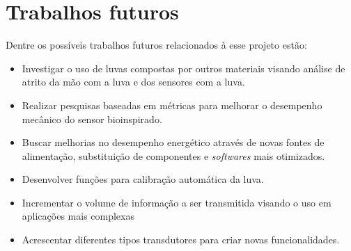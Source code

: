 \documentclass[
	12pt,				%
	openright,			%
	oneside,			%
	a4paper,			%
	english,			%
	brazil				%
	]{abntex2}
\begin{document}
			\section{Trabalhos futuros}		

		Dentre os possíveis trabalhos futuros relacionados à esse projeto estão:

		\begin{itemize}
			\item Investigar o uso de luvas compostas por outros materiais visando análise de atrito da mão com a luva e dos sensores com a luva.
			\item Realizar pesquisas baseadas em métricas para melhorar o desempenho mecânico do sensor bioinspirado.
			\item Buscar melhorias no desempenho energético através de novas fontes de alimentação, substituição de componentes e \textit{softwares} mais otimizados.
			\item Desenvolver funções para calibração automática da luva.
			\item Incrementar o volume de informação a ser transmitida visando o uso em aplicações mais complexas
			\item Acrescentar diferentes tipos transdutores para criar novas funcionalidades.
		\end{itemize}

		
\postextual



\printindex
\end{document}
